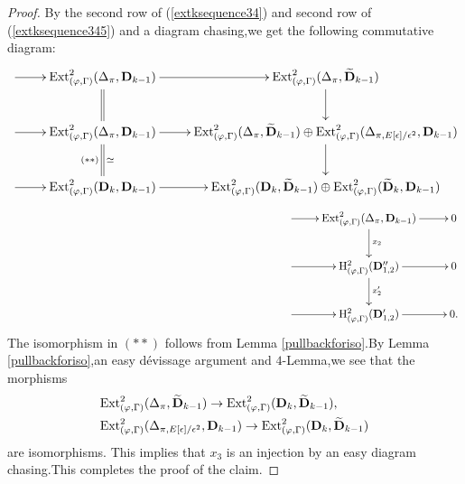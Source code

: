 \documentclass[SecEq,CM,GP]{degruyter-crelle} %
\theoremstyle{plain}
\newcommand{\Dpik}{{\mathbf{D}}}
\newcommand{\ext}{{\rm Ext}}
\newcommand{\hH}{{\mathrm{H}}}
\begin{document}
\begin{proof}
By the second row of  (\ref{extksequence34}) and second row of  (\ref{extksequence345}) and a diagram chasing,\;we get the following commutative diagram:
\begin{equation}
		\xymatrix{ \ar[r] & \ext^2_{(\varphi,\Gamma)}({\Delta_\pi},\Dpik_{k-1}) \ar@{=}[d]  \ar[r] & \ext^2_{(\varphi,\Gamma)}({\Delta_\pi},\widetilde{\Dpik}_{k-1}) \ar[d] \\
			\ar[r] & \ext^2_{(\varphi,\Gamma)}({\Delta_\pi},\Dpik_{k-1}) \ar@{=}[d]^{\simeq}_{(\ast\ast)} \ar[r]
			& \ext^2_{(\varphi,\Gamma)}({\Delta_\pi},\widetilde{\Dpik}_{k-1}) \oplus\ext^2_{(\varphi,\Gamma)}(\Delta_{\pi,E[\epsilon]/\epsilon^2},\Dpik_{k-1}) \ar[d]  \\
		\ar[r] & {\ext}^2_{(\varphi,\Gamma)}({\Dpik}_{k},\Dpik_{k-1}) \ar[r]			& {\ext}^2_{(\varphi,\Gamma)}({\Dpik}_{k},\widetilde{\Dpik}_{k-1})\oplus{\ext}^2_{(\varphi,\Gamma)}(\widetilde{\mathbf{D}}_{k},\Dpik_{k-1})}	
\end{equation}
\begin{equation}
		\hspace{250pt}	\xymatrix{  \ar[r] &\ext^2_{(\varphi,\Gamma)}({\Delta_\pi},\Dpik_{k-1}) \ar[d]^{x_2} \ar[r] &0 \\
			\ar[r]  & \hH^2_{(\varphi,\Gamma)}(\Dpik_{1,2}'') \ar[d]^{x_2'} \ar[r] &0 \\
			\ar[r]  & \hH^2_{(\varphi,\Gamma)}(\Dpik_{1,2}')\ar[r] &0 
			.}
\end{equation}		
The isomorphism in $(\ast\ast)$ follows from Lemma \ref{pullbackforiso}.\;By Lemma \ref{pullbackforiso},\;an easy d\'{e}vissage argument and $4$-Lemma,\;we see that the morphisms 
\begin{equation}
	\begin{aligned}
		&\ext^2_{(\varphi,\Gamma)}({\Delta_\pi},\widetilde{\Dpik}_{k-1}) \rightarrow \ext^2_{(\varphi,\Gamma)}(\Dpik_{k},\widetilde{\Dpik}_{k-1}),\;\\
		&\ext^2_{(\varphi,\Gamma)}(\Delta_{\pi,E[\epsilon]/\epsilon^2},\Dpik_{k-1})  \rightarrow \ext^2_{(\varphi,\Gamma)}(\Dpik_{k},\widetilde{\Dpik}_{k-1})
	\end{aligned}
	\end{equation}
are isomorphisms. This implies that $x_3$ is an injection by an easy  diagram chasing.\;This completes the proof of the claim.\;


\end{proof}
\end{document}
